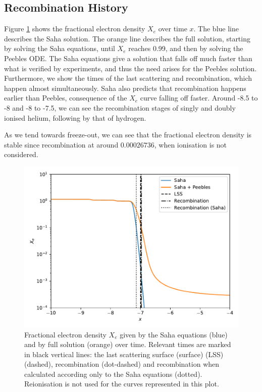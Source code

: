 \documentclass{aa}
\begin{document}
\subsection{Recombination History}

Figure \ref{fig:Xe-Saha} shows the fractional electron density $X_e$ over time $x$. The blue line describes the Saha solution. The orange line describes the full solution, starting by solving the Saha equations, until $X_e$ reaches 0.99, and then by solving the Peebles ODE. The Saha equations give a solution that falls off much faster than what is verified by experiments, and thus the need arises for the Peebles solution. Furthermore, we show the times of the last scattering and recombination, which happen almost simultaneously. Saha also predicts that recombination happens earlier than Peebles, consequence of the $X_e$ curve falling off faster. Around -8.5 to -8 and -8 to -7.5, we can see the recombination stages of singly and doubly ionised helium, following by that of hydrogen.

As we tend towards freeze-out, we can see that the fractional electron density is stable since recombination at around $0.00026736$, when ionisation is not considered.

\begin{figure}[ht]
    \centering
    \includegraphics[width=\hsize]{report/figures/Xe.pdf}
    \caption{Fractional electron density $X_e$ given by the Saha equations (blue) and by full solution (orange) over time. Relevant times are marked in black vertical lines: the last scattering surface (surface) (LSS) (dashed),  recombination (dot-dashed) and recombination when calculated according only to the Saha equations (dotted). Reionisation is not used for the curves represented in this plot.}
    \label{fig:Xe-Saha}
\end{figure}
\end{document}

